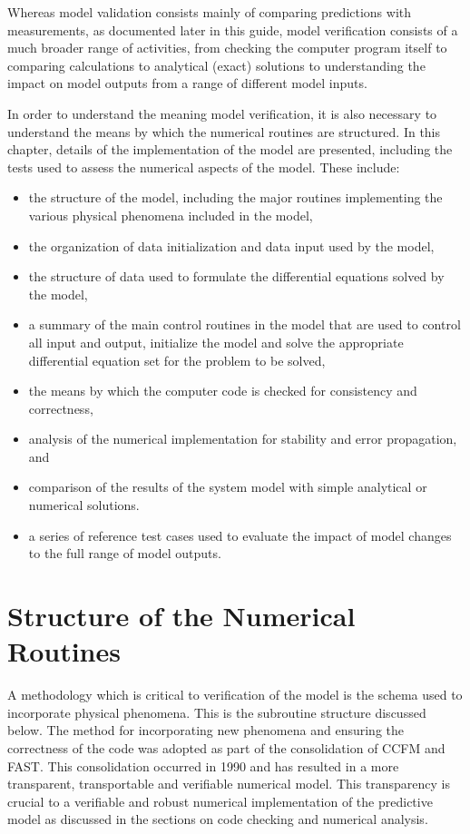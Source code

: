 Whereas model validation consists mainly of comparing predictions with measurements, as documented later in this guide,
model verification consists of a much broader range of activities, from checking the computer program
itself to comparing calculations to analytical (exact) solutions to understanding the impact on model outputs from a range of different model inputs.

In order to understand the meaning model verification, it is also  necessary to understand the
means by which the numerical routines are structured. In this chapter, details of the
implementation of the model are presented, including the tests used to assess the numerical
aspects of the model. These include:

\begin{itemize}
\item the structure of the model, including the major routines implementing the various
physical phenomena included in the model,
\item the organization of data initialization and data input used by the model,
\item the structure of data used to formulate the differential equations solved by the model,
\item a summary of the main control routines in the model that are used to control all input and
output, initialize the model and solve the appropriate differential equation set for the
problem to be solved,
\item the means by which the computer code is checked for consistency and correctness,
\item analysis of the numerical implementation for stability and error propagation, and
\item comparison of the results of the system model with simple analytical or numerical
solutions.
\item a series of reference test cases used to evaluate the impact of model changes to the full range of model outputs.
\end{itemize}

\section{Structure of the Numerical Routines}

A methodology which is critical to verification of the model is the schema used to incorporate
physical phenomena. This is the subroutine structure discussed below. The method for
incorporating new phenomena and ensuring the correctness of the code was adopted as part of
the consolidation of CCFM and FAST. This consolidation occurred in 1990 and has resulted in a
more transparent, transportable and verifiable numerical model. This transparency is crucial to a
verifiable and robust numerical implementation of the predictive model as discussed in the
sections on code checking and numerical analysis.


